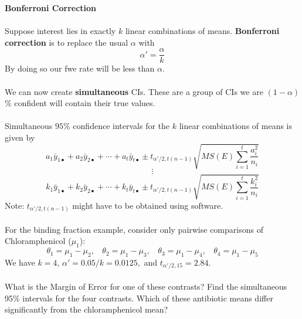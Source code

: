 \newpage

\textbf{Bonferroni Correction}\\~\\
Suppose interest lies in exactly $k$ linear combinations of means.  \textbf{Bonferroni correction} is to replace the usual $\alpha$ with
$$ \alpha'=\frac{\alpha}{k}$$
By doing so our fwe rate will be less than $\alpha$.\\~\\
We can now create \textbf{simultaneous} CIs.  These are a group of CIs we are $(1-\alpha)$\% confident will  contain their true values.\\~\\
Simultaneous $95\%$ confidence intervals for the $k$ linear combinations of means is given by
$$ a_1 \bar{y}_{1\bullet} + a_2 \bar{y}_{2\bullet} + \cdots + a_t \bar{y}_{t\bullet} \pm t_{\alpha'/2,t(n-1)}\sqrt{MS(E) \sum_{i=1}^{t} \frac{a_i^2}{n_i}} $$
$$\vdots$$ 
$$ k_1 \bar{y}_{1\bullet} + k_2 \bar{y}_{2\bullet} + \cdots + k_t \bar{y}_{t\bullet} \pm t_{\alpha'/2,t(n-1)}\sqrt{MS(E) \sum_{i=1}^{t} \frac{k_i^2}{n_i}} $$
Note: $t_{\alpha'/2,t(n-1)}$ might have to be obtained using software.\\~\\
For the binding fraction example, consider only pairwise comparisons of Chloramphenicol ($\mu_1$):
$$\theta_1 = \mu_1-\mu_2, ~~~~\theta_2 = \mu_1-\mu_3, ~~~~\theta_3 = \mu_1-\mu_4, ~~~~\theta_4 = \mu_1-\mu_5$$
We have $k=4$, $ \alpha'=0.05/k=0.0125,$ and $t_{\alpha'/2,15} = 2.84$.\\~\\
What is the Margin of Error for one of these contrasts?  Find the simultaneous 95\% intervals for the four contrasts.  Which of these antibiotic means differ significantly from the chloramphenicol mean?\\

